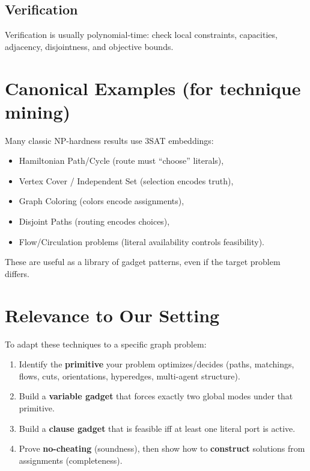 \documentclass[11pt]{article}
\begin{document}
\subsection*{Verification}
Verification is usually polynomial-time: check local constraints, capacities, adjacency, disjointness, and objective bounds.

\section{Canonical Examples (for technique mining)}
Many classic NP-hardness results use 3SAT embeddings:
\begin{itemize}[itemsep=2pt]
  \item Hamiltonian Path/Cycle (route must ``choose'' literals),
  \item Vertex Cover / Independent Set (selection encodes truth),
  \item Graph Coloring (colors encode assignments),
  \item Disjoint Paths (routing encodes choices),
  \item Flow/Circulation problems (literal availability controls feasibility).
\end{itemize}
These are useful as a library of gadget patterns, even if the target problem differs.

\section{Relevance to Our Setting}
To adapt these techniques to a specific graph problem:
\begin{enumerate}[itemsep=2pt]
  \item Identify the \textbf{primitive} your problem optimizes/decides (paths, matchings, flows, cuts, orientations, hyperedges, multi-agent structure).
  \item Build a \textbf{variable gadget} that forces exactly two global modes under that primitive.
  \item Build a \textbf{clause gadget} that is feasible iff at least one literal port is active.
  \item Prove \textbf{no-cheating} (soundness), then show how to \textbf{construct} solutions from assignments (completeness).
\end{enumerate}
\end{document}
